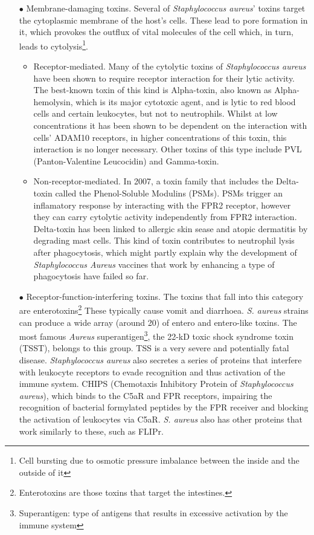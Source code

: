 \begin{itemize}
\item[$\bullet$] Membrane-damaging toxins. Several of \emph{Staphylococcus aureus}' toxins target the cytoplasmic membrane of the host's cells. These lead to pore formation in it, which provokes the outflux of vital molecules of the cell which, in turn, leads to cytolysis\footnote{Cell bursting due to osmotic pressure imbalance between the inside and the outside of it}.
   \begin{itemize}
        \item Receptor-mediated. Many of the cytolytic toxins of \emph{Staphylococcus aureus} have been shown to require receptor interaction for their lytic activity. The best-known toxin of this kind is Alpha-toxin, also known as Alpha-hemolysin, which is its major cytotoxic agent, and is lytic to red blood cells and certain leukocytes, but not to neutrophils. Whilst at low concentrations it has been shown to be dependent on the interaction with cells' ADAM10 receptors, in higher concentrations of this toxin, this interaction is no longer necessary. Other toxins of this type include  PVL (Panton-Valentine Leucocidin) and Gamma-toxin.
        \item Non-receptor-mediated. In 2007, a toxin family that includes the Delta-toxin called the Phenol-Soluble Modulins (PSMs). PSMs trigger an inflamatory response by interacting with the FPR2 receptor, however they can carry cytolytic activity independently from FPR2 interaction. Delta-toxin has been linked to allergic skin sease and atopic dermatitis by degrading mast cells. This kind of toxin contributes to neutrophil lysis after phagocytosis, which might partly explain why the development of \emph{Staphylococcus Aureus} vaccines that work by enhancing a type of phagocytosis have failed so far. 
   \end{itemize}
\item[$\bullet$] Receptor-function-interfering toxins. The toxins that fall into this category are enterotoxins\footnote{Enterotoxins are those toxins that target the intestines.} These typically cause vomit and diarrhoea. \emph{S. aureus} strains can produce a wide array (around 20) of entero and entero-like toxins. The most famous \emph{Aureus} superantigen\footnote{Superantigen: type of antigens that results in excessive activation by the immune system}, the 22-kD toxic shock syndrome toxin (TSST), belongs to this group. TSS is a very severe and potentially fatal disease. \emph{Staphylococcus aureus} also secretes a series of proteins that interfere with leukocyte receptors to evade recognition and thus activation of the immune system. CHIPS (Chemotaxis Inhibitory Protein of \emph{Staphylococcus aureus}), which binds to the C5aR and FPR receptors, impairing the recognition of bacterial formylated peptides by the FPR receiver and blocking the activation of leukocytes via C5aR. \emph{S. aureus} also has other proteins that work similarly to these, such as FLIPr.

\end{itemize}
